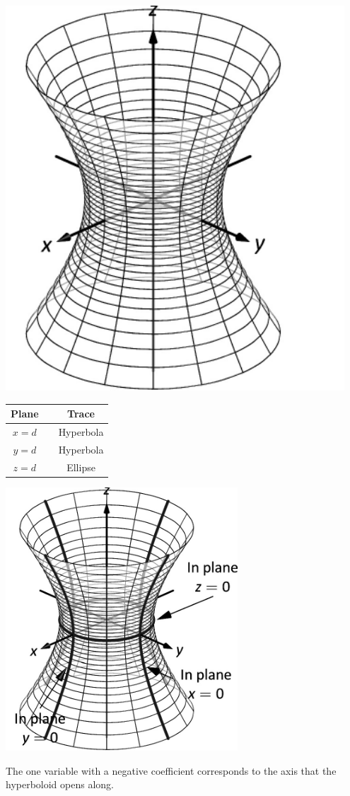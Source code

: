 \begin{minipage}[c]{.3\linewidth}
\vskip0pt
\includegraphics[width=0.95\textwidth]{fig_ana_geo_20a}
\end{minipage}
\begin{minipage}[c]{.25\linewidth}
\vskip0pt\hskip 10pt
\begin{tabular}[]{ccc}
\textbf{Plane}  & & \textbf{Trace} \\ \hline
$x=d$ & & Hyperbola \\
$y=d$ & & Hyperbola\\
$z=d$ & & Ellipse
\end{tabular}
\end{minipage}%
\begin{minipage}[c]{.45\linewidth}
\includegraphics[width=0.65\textwidth]{fig_ana_geo_20b}
\end{minipage}
The one variable with a negative coefficient corresponds to the axis that the hyperboloid opens along.

